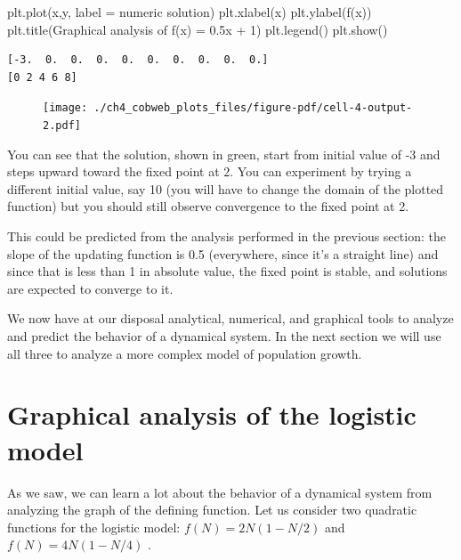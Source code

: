 \documentclass[
  letterpaper,
  DIV=11,
  numbers=noendperiod]{scrreprt}
\newenvironment{Shaded}{\begin{snugshade}}{\end{snugshade}}
\newcommand{\NormalTok}[1]{\textcolor[rgb]{0.00,0.23,0.31}{#1}}
\newcommand{\OperatorTok}[1]{\textcolor[rgb]{0.37,0.37,0.37}{#1}}
\newcommand{\StringTok}[1]{\textcolor[rgb]{0.13,0.47,0.30}{#1}}
\begin{document}
\begin{Shaded}
\begin{Highlighting}[]
\NormalTok{plt.plot(x,y, label }\OperatorTok{=} \StringTok{\textquotesingle{}numeric solution\textquotesingle{}}\NormalTok{)    }
\NormalTok{plt.xlabel(}\StringTok{\textquotesingle{}x\textquotesingle{}}\NormalTok{)}
\NormalTok{plt.ylabel(}\StringTok{\textquotesingle{}f(x)\textquotesingle{}}\NormalTok{)}
\NormalTok{plt.title(}\StringTok{\textquotesingle{}Graphical analysis of f(x) = 0.5x + 1\textquotesingle{}}\NormalTok{)}
\NormalTok{plt.legend()}
\NormalTok{plt.show()}
\end{Highlighting}
\end{Shaded}

\begin{verbatim}
[-3.  0.  0.  0.  0.  0.  0.  0.  0.  0.]
[0 2 4 6 8]
\end{verbatim}

\begin{figure}[H]

{\centering \texttt{[image: ./ch4\_cobweb\_plots\_files/figure-pdf/cell-4-output-2.pdf]}

}

\end{figure}

You can see that the solution, shown in green, start from initial value
of -3 and steps upward toward the fixed point at 2. You can experiment
by trying a different initial value, say 10 (you will have to change the
domain of the plotted function) but you should still observe convergence
to the fixed point at 2.

This could be predicted from the analysis performed in the previous
section: the slope of the updating function is 0.5 (everywhere, since
it's a straight line) and since that is less than 1 in absolute value,
the fixed point is stable, and solutions are expected to converge to it.

We now have at our disposal analytical, numerical, and graphical tools
to analyze and predict the behavior of a dynamical system. In the next
section we will use all three to analyze a more complex model of
population growth.

\hypertarget{graphical-analysis-of-the-logistic-model}{%
\section{Graphical analysis of the logistic
model}\label{graphical-analysis-of-the-logistic-model}}

As we saw, we can learn a lot about the behavior of a dynamical system
from analyzing the graph of the defining function. Let us consider two
quadratic functions for the logistic model: \(f(N) = 2N(1-N/2)\) and
\(f(N) = 4N(1-N/4)\) .
\end{document}
